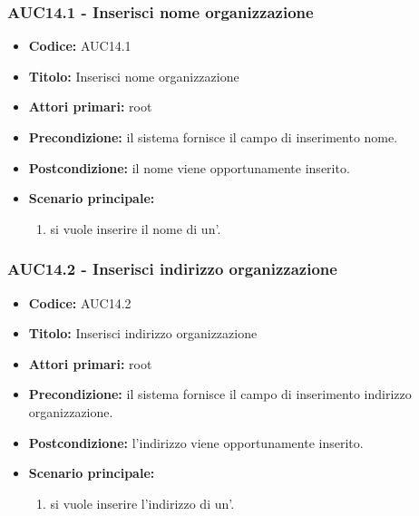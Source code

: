 \documentclass[casi-duso]{subfiles}
\begin{document}
  \subsubsection{AUC14.1 - Inserisci nome organizzazione}
  \label{subsub:AUC14.1}
  \begin{itemize}
    \item \textbf{Codice:} AUC14.1
    \item \textbf{Titolo:} Inserisci nome organizzazione
    \item \textbf{Attori primari:} root
    \item \textbf{Precondizione:} il sistema fornisce il campo di inserimento nome.
    \item \textbf{Postcondizione:} il nome viene opportunamente inserito.
    \item \textbf{Scenario principale:} 
    \begin{enumerate}
      \item si vuole inserire il nome di un'.
    \end{enumerate}
    
  \end{itemize}
  
  \subsubsection{AUC14.2 - Inserisci indirizzo organizzazione}
  \label{subsub:AUC14.2}
  \begin{itemize}
    \item \textbf{Codice:} AUC14.2
    \item \textbf{Titolo:} Inserisci indirizzo organizzazione
    \item \textbf{Attori primari:} root
    \item \textbf{Precondizione:} il sistema fornisce il campo di inserimento indirizzo organizzazione.
    \item \textbf{Postcondizione:} l'indirizzo viene opportunamente inserito.
    \item \textbf{Scenario principale:}
    \begin{enumerate}
      \item si vuole inserire l'indirizzo di un'.
    \end{enumerate}
  \end{itemize}
  
\end{document}
